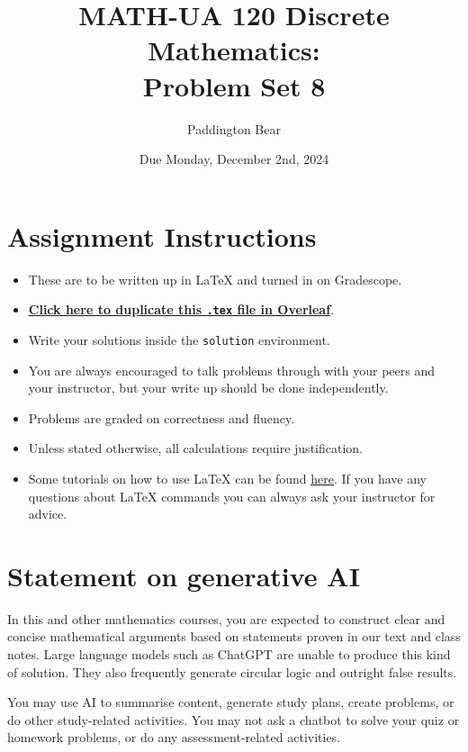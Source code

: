 \documentclass{article}
\title{\textbf{MATH-UA 120 Discrete Mathematics: \\ Problem Set 8}}
\author{%
    Paddington Bear %
}
\date{Due Monday, December 2nd, 2024} %
\theoremstyle{definition}
\begin{document}
\maketitle %

\vfill

\section*{Assignment Instructions}

\begin{itemize}
    \item These are to be written up in \LaTeX{} and turned in on Gradescope.
    \item \href{https://bit.ly/4dWlKX0}{\textbf{Click here to duplicate this \texttt{.tex} file in Overleaf}}.
    \item Write your solutions inside the \texttt{solution} environment.
    \item You are always encouraged to talk problems through with your peers and your instructor, but your write up should be done independently.
    \item Problems are graded on correctness and fluency.
    \item Unless stated otherwise, all calculations require justification.
    \item Some tutorials on how to use \LaTeX{} can be found \href{https://www.overleaf.com/learn/latex/Tutorials}{\underline{here}}. If you have any questions about \LaTeX{} commands you can always ask your instructor for advice.
\end{itemize}

\vfill

\section*{Statement on generative AI}

In this and other mathematics courses, you are expected to construct clear and concise mathematical arguments based on statements proven in our text and class notes. Large language models such as ChatGPT are unable to produce this kind of solution. They also frequently generate circular logic and outright false results.
 
You may use AI to summarise content, generate study plans, create problems, or do other study-related activities. You may not ask a chatbot to solve your quiz or homework problems, or do any assessment-related activities.
 
\end{document}
